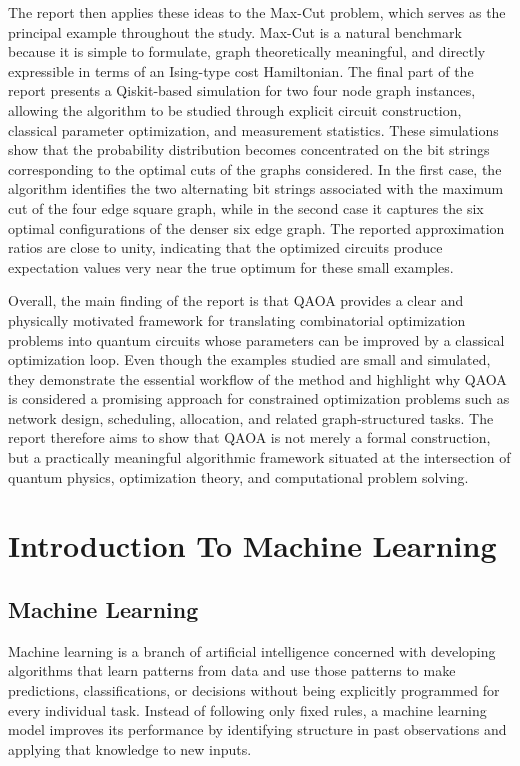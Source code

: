 \documentclass[english,12pt,a4paper]{report}
\begin{document}
	The report then applies these ideas to the Max-Cut problem, which serves as the principal example throughout the study. Max-Cut is a natural benchmark because it is simple to formulate, graph theoretically meaningful, and directly expressible in terms of an Ising-type cost Hamiltonian. The final part of the report presents a Qiskit-based simulation for two four node graph instances, allowing the algorithm to be studied through explicit circuit construction, classical parameter optimization, and measurement statistics. These simulations show that the probability distribution becomes concentrated on the bit strings corresponding to the optimal cuts of the graphs considered. In the first case, the algorithm identifies the two alternating bit strings associated with the maximum cut of the four edge square graph, while in the second case it captures the six optimal configurations of the denser six edge graph. The reported approximation ratios are close to unity, indicating that the optimized circuits produce expectation values very near the true optimum for these small examples.
	
	Overall, the main finding of the report is that QAOA provides a clear and physically motivated framework for translating combinatorial optimization problems into quantum circuits whose parameters can be improved by a classical optimization loop. Even though the examples studied are small and simulated, they demonstrate the essential workflow of the method and highlight why QAOA is considered a promising approach for constrained optimization problems such as network design, scheduling, allocation, and related graph-structured tasks. The report therefore aims to show that QAOA is not merely a formal construction, but a practically meaningful algorithmic framework situated at the intersection of quantum physics, optimization theory, and computational problem solving.
	
	
	\chapter{Introduction To Machine Learning}
	\section{Machine Learning}
	\hspace{1.15em}Machine learning is a branch of artificial intelligence concerned with developing algorithms that learn patterns from data and use those patterns to make predictions, classifications, or decisions without being explicitly programmed for every individual task. Instead of following only fixed rules, a machine learning model improves its performance by identifying structure in past observations and applying that knowledge to new inputs.
	
\end{document}
